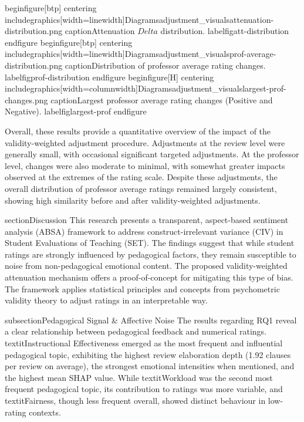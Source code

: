 begin{figure}[btp]  
    centering
    includegraphics[width=linewidth]{Diagramsadjustment_visualsattenuation-distribution.png}
    caption{Attenuation $Delta$ distribution.}
    label{figatt-distribution}
end{figure}
begin{figure}[btp]  
    centering
    includegraphics[width=linewidth]{Diagramsadjustment_visualsprof-average-distribution.png}
    caption{Distribution of professor average rating changes.}
    label{figprof-distribution}
end{figure}
begin{figure}[H]  
    centering
    includegraphics[width=columnwidth]{Diagramsadjustment_visualslargest-prof-changes.png}
    caption{Largest professor average rating changes (Positive and Negative).}
    label{figlargest-prof}
end{figure}

Overall, these results provide a quantitative overview of the impact of the validity-weighted adjustment procedure. Adjustments at the review level were generally small, with occasional significant targeted adjustments. At the professor level, changes were also moderate to minimal, with somewhat greater impacts observed at the extremes of the rating scale. Despite these adjustments, the overall distribution of professor average ratings remained largely consistent, showing high similarity before and after validity-weighted adjustments.

section{Discussion}
This research presents a transparent, aspect-based sentiment analysis (ABSA) framework to address construct-irrelevant variance (CIV) in Student Evaluations of Teaching (SET). The findings suggest that while student ratings are strongly influenced by pedagogical factors, they remain susceptible to noise from non-pedagogical emotional content. The proposed validity-weighted attenuation mechanism offers a proof-of-concept for mitigating this type of bias. The framework applies statistical principles and concepts from psychometric validity theory to adjust ratings in an interpretable way.

subsection{Pedagogical Signal & Affective Noise}
The results regarding RQ1 reveal a clear relationship between pedagogical feedback and numerical ratings. textit{Instructional Effectiveness} emerged as the most frequent and influential pedagogical topic, exhibiting the highest review elaboration depth (1.92 clauses per review on average), the strongest emotional intensities when mentioned, and the highest mean SHAP value. While textit{Workload} was the second most frequent pedagogical topic, its contribution to ratings was more variable, and textit{Fairness}, though less frequent overall, showed distinct behaviour in low-rating contexts.

